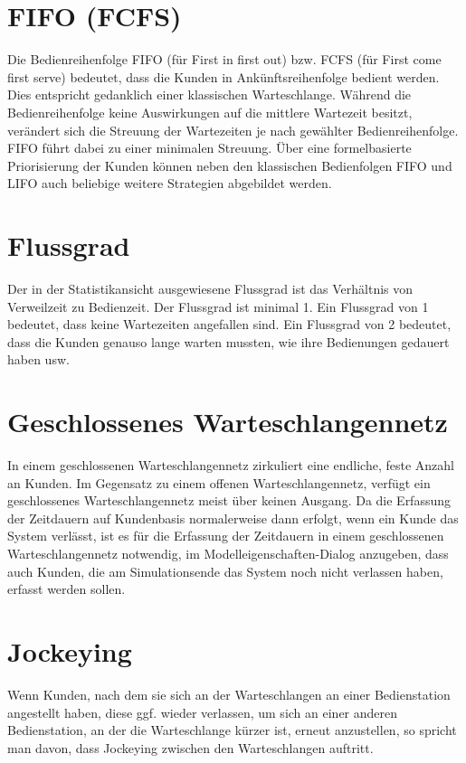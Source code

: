 \section*{FIFO (FCFS)}


Die Bedienreihenfolge FIFO (für First in first out) bzw. FCFS (für First come first serve) bedeutet,
dass die Kunden in Ankünftsreihenfolge bedient werden. Dies entspricht gedanklich einer klassischen Warteschlange.
Während die Bedienreihenfolge keine Auswirkungen auf die mittlere Wartezeit besitzt, verändert sich
die Streuung der Wartezeiten je nach gewählter Bedienreihenfolge. FIFO führt dabei zu einer minimalen Streuung.
Über eine formelbasierte Priorisierung der Kunden können neben den klassischen Bedienfolgen FIFO und LIFO auch
beliebige weitere Strategien abgebildet werden.

\section*{Flussgrad}


Der in der Statistikansicht ausgewiesene Flussgrad ist
das Verhältnis von Verweilzeit zu Bedienzeit. Der Flussgrad ist minimal 1. Ein Flussgrad
von 1 bedeutet, dass keine Wartezeiten angefallen sind. Ein Flussgrad von 2 bedeutet, dass
die Kunden genauso lange warten mussten, wie ihre Bedienungen gedauert haben usw.

\section*{Geschlossenes Warteschlangennetz}


In einem geschlossenen Warteschlangennetz zirkuliert eine endliche, feste Anzahl an Kunden.
Im Gegensatz zu einem offenen Warteschlangennetz, verfügt ein geschlossenes Warteschlangennetz
meist über keinen Ausgang. Da die Erfassung der Zeitdauern
auf Kundenbasis normalerweise dann erfolgt, wenn ein Kunde das System verlässt, ist es für die Erfassung
der Zeitdauern in einem geschlossenen Warteschlangennetz notwendig, im
Modelleigenschaften-Dialog anzugeben, dass auch Kunden, die am
Simulationsende das System noch nicht verlassen haben, erfasst werden sollen.

\section*{Jockeying}


Wenn Kunden, nach dem sie sich an der Warteschlangen an einer Bedienstation angestellt haben,
diese ggf. wieder verlassen, um sich an einer anderen Bedienstation, an der die Warteschlange
kürzer ist, erneut anzustellen, so spricht man davon, dass Jockeying zwischen den Warteschlangen auftritt.

